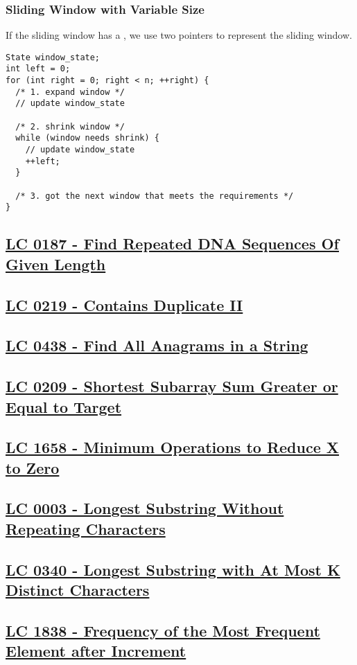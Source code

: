 \subsubsection{Sliding Window with Variable Size}
If the sliding window has a {\color{blue}{variable size}}, we use two pointers to represent the sliding window.
\begin{lstlisting}
State window_state;
int left = 0;
for (int right = 0; right < n; ++right) {
  /* 1. expand window */
  // update window_state

  /* 2. shrink window */
  while (window needs shrink) {
    // update window_state
    ++left;
  }

  /* 3. got the next window that meets the requirements */
}
\end{lstlisting}

\subsection{\hyperref[lc0187]{LC 0187 - Find Repeated DNA Sequences Of Given Length}}
\subsection{\hyperref[lc0219]{LC 0219 - Contains Duplicate II}}
\subsection{\hyperref[lc0438]{LC 0438 - Find All Anagrams in a String}}
\subsection{\hyperref[lc0209]{LC 0209 - Shortest Subarray Sum Greater or Equal to Target}}
\subsection{\hyperref[lc1658]{LC 1658 - Minimum Operations to Reduce X to Zero}}
\subsection{\hyperref[lc0003]{LC 0003 - Longest Substring Without Repeating Characters}}
\subsection{\hyperref[lc0340]{LC 0340 - Longest Substring with At Most K Distinct Characters}}
\subsection{\hyperref[lc1838]{LC 1838 - Frequency of the Most Frequent Element after Increment}}
